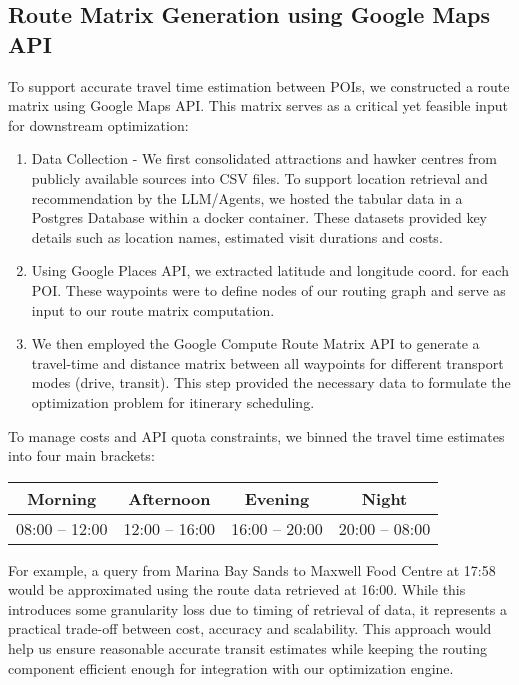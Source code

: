 \documentclass{ecai}
\begin{document}
\subsection{Route Matrix Generation using Google Maps API}
To support accurate travel time estimation between POIs, we constructed a route matrix using Google Maps API. This matrix serves as a critical yet feasible input for downstream optimization:
\begin{enumerate}
    \item Data Collection - We first consolidated attractions and hawker centres from publicly available sources into CSV files. To support location retrieval and recommendation by the LLM/Agents, we hosted the tabular data in a Postgres Database within a docker container. These datasets provided key details such as location names, estimated visit durations and costs.
    \item Using Google Places API, we extracted latitude and longitude coord. for each POI. These waypoints were to define nodes of our routing graph and serve as input to our route matrix computation.
    \item We then employed the Google Compute Route Matrix API to generate a travel-time and distance matrix between all waypoints for different transport modes (drive, transit). This step provided the necessary data to formulate the optimization problem for itinerary scheduling.
\end{enumerate}

To manage costs and API quota constraints, we binned the travel time estimates into four main brackets:
\begin{table}[h]
    \centering
    \begin{tabular}{|c|c|c|c|}
         \hline
         \textbf{Morning} & \textbf{Afternoon} & \textbf{Evening} & \textbf{Night} \\
         \hline
         08:00 – 12:00 & 12:00 – 16:00 & 16:00 – 20:00 & 20:00 – 08:00 \\
         \hline
    \end{tabular}
\end{table}

For example, a query from Marina Bay Sands to Maxwell Food Centre at 17:58 would be approximated using the route data retrieved at 16:00. While this introduces some granularity loss due to timing of retrieval of data, it represents a practical trade-off between cost, accuracy and scalability. This approach would help us ensure reasonable accurate transit estimates while keeping the routing component efficient enough for integration with our optimization engine.
\end{document}
